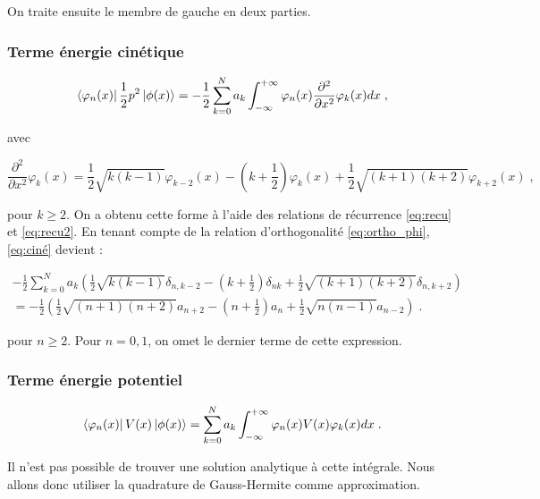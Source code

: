 \documentclass{report}
\begin{document}
On traite ensuite le membre de gauche en deux parties.

\subsubsection{Terme énergie cinétique}

\begin{equation}\label{eq:ciné}
\bra{\varphi_n(x)} \frac{1}{2}p^{2} \ket{\phi(x)} = - \frac{1}{2}\sum_{k=0}^N a_k \int_{-\infty}^{+\infty} \varphi_n(x) \frac{\partial^2}{\partial x^{2}} \varphi_k(x) dx\;,
\end{equation}

avec 

\begin{equation}
 \frac{\partial^2}{\partial x^{2}} \varphi_k(x) = \frac{1}{2}\sqrt{k(k-1)}\varphi_{k-2}(x) -\left(k+\frac{1}{2}\right)\varphi_k(x) + \frac{1}{2} \sqrt{(k+1)(k+2)}\varphi_{k+2}(x)\;,
\end{equation}

pour $k \geq 2$. On a obtenu cette forme à l'aide des relations de récurrence \eqref{eq:recu} et \eqref{eq:recu2}. En tenant compte de la relation d'orthogonalité \eqref{eq:ortho_phi}, \eqref{eq:ciné} devient :

\begin{eqnarray}
- \frac{1}{2}\sum_{k=0}^N a_k \left(\frac{1}{2}\sqrt{k(k-1)}\delta_{n,k-2} - \left(k+\frac{1}{2}\right)\delta_{nk}+ \frac{1}{2} \sqrt{(k+1)(k+2)}\delta_{n,k+2} \right) \\
= - \frac{1}{2}\left(\frac{1}{2}\sqrt{(n+1)(n+2)}a_{n+2}-\left(n+\frac{1}{2}\right)a_{n}+\frac{1}{2}\sqrt{n(n-1)}a_{n-2} \right)\;.
\end{eqnarray}

pour $n \geq 2$. Pour $n = 0,1$, on omet le dernier terme de cette expression.

\subsubsection{Terme énergie potentiel}

\begin{equation}
\bra{\varphi_n(x)} V(x)\ket{\phi(x)} = \sum_{k=0}^N a_k\int_{-\infty}^{+\infty} \varphi_n(x) V(x) \varphi_k(x) dx\;.
\end{equation}

Il n'est pas possible de trouver une solution analytique à cette intégrale. Nous allons donc utiliser la quadrature de Gauss-Hermite comme approximation.
\end{document}
